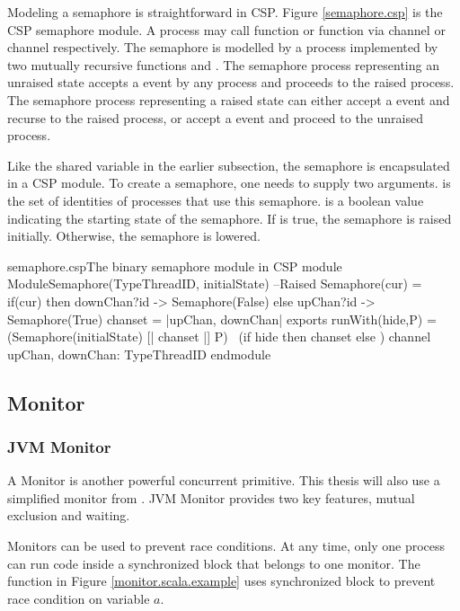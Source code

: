 \documentclass[a4paper, 12pt]{article}
\begin{document}
Modeling a semaphore is straightforward in CSP. Figure \ref{semaphore.csp} is the CSP semaphore module. A process may call  function or  function via channel  or channel  respectively. The semaphore is modelled by a process implemented by two mutually recursive functions  and . The semaphore process representing an unraised state accepts a  event by any process and proceeds to the raised process. The semaphore process representing a raised state can either accept a  event and recurse to the raised process, or accept a  event and proceed to the unraised process.

Like the shared variable in the earlier subsection, the semaphore is encapsulated in a CSP module. To create a semaphore, one needs to supply two arguments.  is the set of identities of processes that use this semaphore.  is a boolean value indicating the starting state of the semaphore. If  is true, the semaphore is raised initially. Otherwise, the semaphore is lowered. 
\begin{cspfloat}{semaphore.csp}{The binary semaphore module in CSP}
  module ModuleSemaphore(TypeThreadID, initialState)  
  --Raised
  Semaphore(cur) = if(cur) then downChan?id -> Semaphore(False)
                            else upChan?id   -> Semaphore(True)
  chanset = {|upChan, downChan|}
exports
  runWith(hide,P) = (Semaphore(initialState) [| chanset |] P) \ 
                      (if hide then chanset else {})
  channel upChan, downChan: TypeThreadID
endmodule\end{cspfloat}

\subsection{Monitor}
\subsubsection{JVM Monitor}
A Monitor is another powerful concurrent primitive. This thesis will also use a simplified monitor from \cite{CPinJava}. JVM Monitor provides two key features, mutual exclusion and waiting. 

Monitors can be used to prevent race conditions. At any time, only one process can run code inside a synchronized block that belongs to one monitor. The function  in Figure \ref{monitor.scala.example} uses synchronized block to prevent race condition on variable $a$. 
\end{document}
